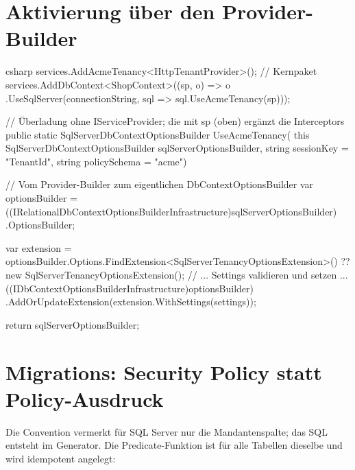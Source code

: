 \section{Aktivierung über den Provider-Builder}

\begin{sourcecode}{csharp}
services.AddAcmeTenancy<HttpTenantProvider>();                    // Kernpaket
services.AddDbContext<ShopContext>((sp, o) => o
    .UseSqlServer(connectionString, sql => sql.UseAcmeTenancy(sp)));

// Überladung ohne IServiceProvider; die mit sp (oben) ergänzt die Interceptors
public static SqlServerDbContextOptionsBuilder UseAcmeTenancy(
    this SqlServerDbContextOptionsBuilder sqlServerOptionsBuilder,
    string sessionKey = "TenantId",
    string policySchema = "acme")
{
    // Vom Provider-Builder zum eigentlichen DbContextOptionsBuilder
    var optionsBuilder =
        ((IRelationalDbContextOptionsBuilderInfrastructure)sqlServerOptionsBuilder)
        .OptionsBuilder;

    var extension = optionsBuilder.Options.FindExtension<SqlServerTenancyOptionsExtension>()
                    ?? new SqlServerTenancyOptionsExtension();
    // ... Settings validieren und setzen ...
    ((IDbContextOptionsBuilderInfrastructure)optionsBuilder)
        .AddOrUpdateExtension(extension.WithSettings(settings));

    return sqlServerOptionsBuilder;
}
\end{sourcecode}

\section{Migrations: Security Policy statt Policy-Ausdruck}

Die Convention vermerkt für SQL Server nur die Mandantenspalte; das SQL entsteht im
Generator. Die Predicate-Funktion ist für alle Tabellen dieselbe und wird idempotent
angelegt:

